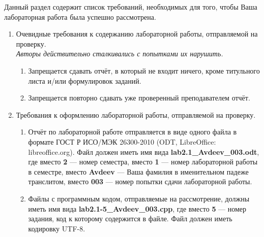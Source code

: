 Данный раздел содержит список требований, необходимых для того, чтобы Ваша лабораторная работа была успешно рассмотрена.

\begin{enumerate}
	\item
		Очевидные требования к содержанию лабораторной работы, отправляемой на проверку.
		\\
		\emph{Авторы действительно сталкивались с попытками их нарушить.}
	\begin{enumerate}
		\item
			Запрещается сдавать отчёт, в который не входит ничего, кроме титульного листа и/или формулировок заданий.
		\item
			Запрещается повторно сдавать уже проверенный преподавателем отчёт.
	\end{enumerate}


	\item
		Требования к оформлению лабораторной работы, отправляемой на проверку.
	\begin{enumerate}
		\item
			Отчёт по лабораторной работе отправляется в виде одного файла в формате ГОСТ Р ИСО/МЭК 26300-2010 (ODT, LibreOffice: libreoffice.org).
			Файл должен иметь имя вида \textbf{lab2.1\_Avdeev\_003.odt},
			где вместо \textbf{2} --- номер семестра, вместо \textbf{1} --- номер лабораторной работы в семестре,
			вместо \textbf{Avdeev} --- Ваша фамилия в именительном падеже транслитом,
			вместо \textbf{003} --- номер попытки сдачи лабораторной работы.
		\item
			Файлы с программным кодом, отправляемые на рассмотрение, должны иметь имя вида \textbf{lab2.1-5\_Avdeev\_003.cpp},
			где вместо \textbf{5} --- номер задания, код к которому содержится в файле.
			Файл должен иметь кодировку UTF-8.
	\end{enumerate}

\end{enumerate}


